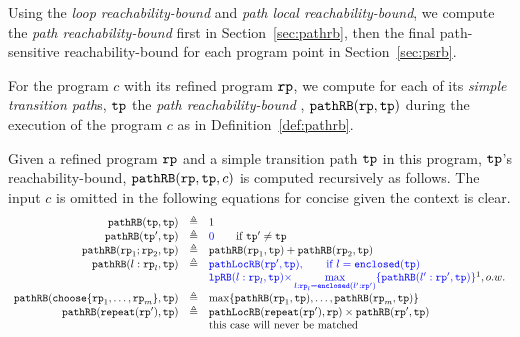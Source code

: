 Using the \emph{loop reachability-bound} and \emph{path local reachability-bound}, we compute the \emph{path reachability-bound} first in Section~\ref{sec:pathrb}, 
then the final path-sensitive reachability-bound for each program point in Section~\ref{sec:psrb}.

For the program $c$ with its refined program $\mathtt{rp}$, we compute
for each of its \emph{simple transition path}s, $\mathtt{tp}$ the \emph{path reachability-bound} , $\mathtt{pathRB}(\mathtt{rp}, \mathtt{tp})$ during the execution of the program $c$ as in Definition~\ref{def:pathrb}.
%
\begin{defn}
  \label{def:pathrb}
  Given a refined program $\mathtt{rp}$ and a simple transition path $\mathtt{tp}$ in this program, 
  $\mathtt{tp}$'s reachability-bound, $\mathtt{pathRB}(\mathtt{rp}, \mathtt{tp}, c)$
  is computed recursively as follows. 
  The input $c$ is omitted in the following equations for concise given the context is clear.
\[
  \begin{array}{rcl}
    \inoutB(\tpath, \tpath) & \triangleq & 1  \\
    \inoutB(\tpath', \tpath) & \triangleq & \highlight{0} \qquad \text{if } \tpath' \neq \tpath\\
    \inoutB(\rprog_1;\rprog_2, \tpath) & \triangleq & \inoutB(\rprog_1, \tpath) + \inoutB(\rprog_2, \tpath) \\
    \inoutB(l: \rprog_l, \tpath) & \triangleq & 
    \highlight{\outinB(\rprog', \tpath), \qquad \text{if } l = \kw{enclosed}(\tpath)}
    \\
    &  & 
    \highlight{
      \lpchB(l:\rprog_l, \tpath ) }
    \highlight{\times \max\limits_{l:\rprog_l = \kw{enclosed}(l':\rprog')}
   \{\inoutB(l':\rprog', \tpath)\} } \footnotemark, o.w. \\
    \inoutB(\rpchoose{\rprog_1, \ldots, \rprog_m }, \tpath) & \triangleq 
    & \max\left\{ \inoutB(\rprog_1, \tpath), \ldots, \inoutB(\rprog_m, \tpath) \right\} 
    \\
    \inoutB(\rprepeat(\rprog'), \tpath) & \triangleq & \outinB(\rprepeat(\rprog'), \rprog) \times \inoutB(\rprog', \tpath)\\
    &  & \text{this case will never be matched}
    \end{array}
  \]
  \end{defn}
%

